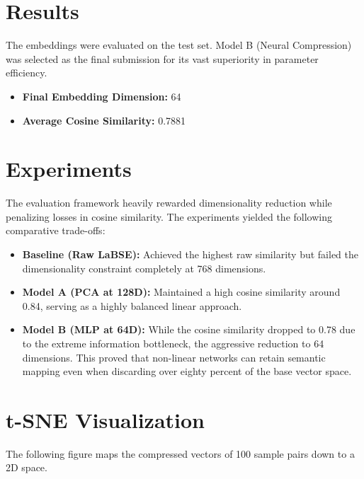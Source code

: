 \documentclass[11pt]{article}
\begin{document}
\section{Results}
The embeddings were evaluated on the test set. Model B (Neural Compression) was selected as the final submission for its vast superiority in parameter efficiency.
\begin{itemize}
    \item \textbf{Final Embedding Dimension:} 64
    \item \textbf{Average Cosine Similarity:} 0.7881
\end{itemize}


\section{Experiments}
The evaluation framework heavily rewarded dimensionality reduction while penalizing losses in cosine similarity. The experiments yielded the following comparative trade-offs:
\begin{itemize}
    \item \textbf{Baseline (Raw LaBSE):} Achieved the highest raw similarity but failed the dimensionality constraint completely at 768 dimensions.
    \item \textbf{Model A (PCA at 128D):} Maintained a high cosine similarity around 0.84, serving as a highly balanced linear approach.
    \item \textbf{Model B (MLP at 64D):} While the cosine similarity dropped to 0.78 due to the extreme information bottleneck, the aggressive reduction to 64 dimensions. This proved that non-linear networks can retain semantic mapping even when discarding over eighty percent of the base vector space.
\end{itemize}

\section{t-SNE Visualization}
The following figure maps the compressed vectors of 100 sample pairs down to a 2D space.
\end{document}
